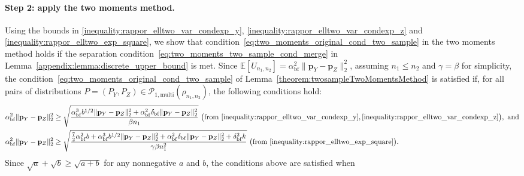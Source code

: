 \documentclass[twoside,11pt]{article}
\newcommand{\rvTwo}{Y}
\newcommand{\rvThree}{Z}
\newcommand{\mE}{\mathbb{E}} %
\newcommand{\normSqMultinomMax}{b}
\newcommand{\alphabetSize}{k} %
\newcommand{\sampleSize}{n}
\newcommand{\probVec}{\mathbf{p}} %
\newcommand{\privacyParameter}{\alpha} %
\newcommand{\privacyParameterrappor}{\privacyParameter_{\mathrm{bf}}}
\newcommand{\maxErrorTypeTwo}{\beta} %
\newcommand{\maxErrorTypeOne}{\gamma} %
\newcommand{\smallNumber}{\delta}
\newcommand{\smallNumberrappor}{\smallNumber_{\mathrm{bf}}}
\begin{document}
\begin{appendix}
	
	\paragraph{Step 2: apply the two moments method.}
	Using the bounds in
	\eqref{inequality:rappor_elltwo_var_condexp_y}, 
	\eqref{inequality:rappor_elltwo_var_condexp_z} 
	and
	\eqref{inequality:rappor_elltwo_exp_square},
	we show that condition~\eqref{eq:two_moments_original_cond_two_sample} in the two moments method holds if the separation condition~\eqref{eq:two_moments_two_sample_cond_merge} in Lemma~\ref{appendix:lemma:discrete_upper_bound} is met.
	Since $\mE[U_{n_1, n_2}]=
	\privacyParameterrappor^2 \|
	\probVec_\rvTwo - \probVec_\rvThree
	\|_2^2$, assuming $\sampleSize_1 \leq \sampleSize_2$ and $\maxErrorTypeOne = \maxErrorTypeTwo$ for simplicity, the condition~\eqref{eq:two_moments_original_cond_two_sample} of Lemma~\ref{theorem:twosampleTwoMomentsMethod} is satisfied if, 	for all pairs of distributions $P = (P_{Y}, P_{Z}) \in \mathcal{P}_{1,\mathrm{multi}}(\rho_{\sampleSize_1,\sampleSize_2})$, the following conditions hold:
	\begin{align*}
		\privacyParameterrappor^2 \| \probVec_\rvTwo - \probVec_\rvThree \|_2^2
		&\geq
		\sqrt{ %
			\frac{ %
				\privacyParameterrappor^3
				\normSqMultinomMax^{1/2}
				\| \probVec_\rvTwo - \probVec_\rvThree \|_2^2
				+
				\privacyParameterrappor^2
				\smallNumberrappor		
				\| \probVec_\rvTwo - \probVec_\rvThree \|_2^2
			}{
				\beta \sampleSize_1}
		}~\bigl(\text{from}~\eqref{inequality:rappor_elltwo_var_condexp_y}, 
		\eqref{inequality:rappor_elltwo_var_condexp_z}\bigr),~\text{and} 
		\\
		\privacyParameterrappor^2 \| \probVec_\rvTwo - \probVec_\rvThree \|_2^2
		&\geq
		\sqrt{
			\frac{
				\frac{7}{2}
				\privacyParameterrappor^2 \normSqMultinomMax
				+
				\privacyParameterrappor^3
				\normSqMultinomMax^{1/2}
				\|\probVec_{\rvTwo} - \probVec_{\rvThree}\|_2^2
				+
				\privacyParameterrappor^2
				\smallNumberrappor
				\|\probVec_{\rvTwo} - \probVec_{\rvThree}\|_2^2
				+
				\smallNumberrappor^2 \alphabetSize
			}{ \gamma \beta \sampleSize_1^2}}	~\bigl(\text{from}~\eqref{inequality:rappor_elltwo_exp_square}\bigr).
	\end{align*}
	Since $\sqrt{a} + \sqrt{b} \geq \sqrt{a+b}$ for any nonnegative $a$ and $b$, the conditions above are satisfied when%

\end{appendix}
\end{document}

